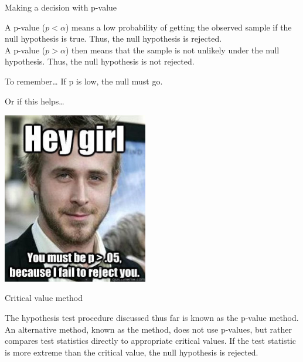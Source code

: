 \documentclass[xcolor=table]{beamer}
\begin{document}
\begin{frame}{Making a decision with p-value}
\begin{block}{}
\large
A  p-value ($p < \alpha$) means a low probability of getting the observed sample if the null hypothesis is true. Thus, the null hypothesis is rejected.\\
\medskip
A  p-value ($p > \alpha$) then means that the sample is not unlikely under the null hypothesis. Thus, the null hypothesis is not rejected.
\end{block}

\pause
\begin{alertblock}{To remember\ldots}
\Large If p is low, the null must go.
\end{alertblock}

\end{frame}

\begin{frame}{Or if this helps\ldots}

{\centering
\includegraphics[width=2.5in]{../images/ch08_p_value_meme}
\par}

\end{frame}

\begin{frame}{Critical value method}
\begin{block}{}
\large
The hypothesis test procedure discussed thus far is known as the p-value method. An alternative method, known as the  method, does not use p-values, but rather compares test statistics directly to appropriate critical values. If the test statistic is more extreme than the critical value, the null hypothesis is rejected.
\end{block}
\end{frame}
\end{document}
